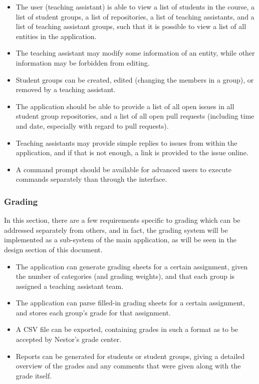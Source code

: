 \documentclass{article}
\begin{document}
			\begin{itemize}
				\item The user (teaching assistant) is able to view a list of students in the course, a list of student groups, a list of repositories, a list of teaching assistants, and a list of teaching assistant groups, such that it is possible to view a list of all entities in the application.
				
				\item The teaching assistant may modify some information of an entity, while other information may be forbidden from editing.
				
				\item Student groups can be created, edited (changing the members in a group), or removed by a teaching assistant.
				
				\item The application should be able to provide a list of all open issues in all student group repositories, and a list of all open pull requests (including time and date, especially with regard to pull requests).
				
				\item Teaching assistants may provide simple replies to issues from within the application, and if that is not enough, a link is provided to the issue online.
				
				\item A command prompt should be available for advanced users to execute commands separately than through the interface.
			\end{itemize}
			
		\subsubsection{Grading}
			In this section, there are a few requirements specific to grading which can be addressed separately from others, and in fact, the grading system will be implemented as a sub-system of the main application, as will be seen in the design section of this document.
			
			\begin{itemize}
				\item The application can generate grading sheets for a certain assignment, given the number of categories (and grading weights), and that each group is assigned a teaching assistant team.
				
				\item The application can parse filled-in grading sheets for a certain assignment, and stores each group's grade for that assignment.
				
				\item A CSV file can be exported, containing grades in such a format as to be accepted by Nestor's grade center.
				
				\item Reports can be generated for students or student groups, giving a detailed overview of the grades and any comments that were given along with the grade itself.
			\end{itemize}
	
\end{document}
